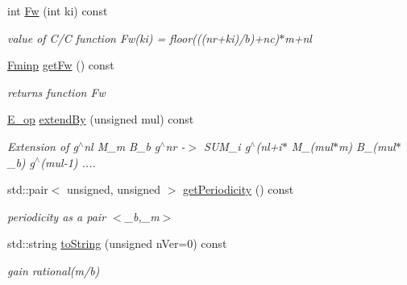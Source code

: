 \begin{DoxyCompactItemize}
int \mbox{\hyperlink{classetvo_i_i_1_1g_ng_a9047025599a1b77ecaf1ec848c5d67d3}{Fw}} (int ki) const
\begin{DoxyCompactList}\small\item\em value of C/C function Fw(ki) = floor(((nr+ki)/b)+nc)$\ast$m+nl \end{DoxyCompactList}\item 
\mbox{\label{classetvo_i_i_1_1g_ng_a86b5837b0df28b1c3dfb84aeff8a1d73}} 
\mbox{\hyperlink{classetvo_i_i_1_1_fminp}{Fminp}} \mbox{\hyperlink{classetvo_i_i_1_1g_ng_a86b5837b0df28b1c3dfb84aeff8a1d73}{get\+Fw}} () const
\begin{DoxyCompactList}\small\item\em returns function Fw \end{DoxyCompactList}\item 
\mbox{\label{classetvo_i_i_1_1g_ng_ac654c7ec491ab5a184137e01a202ef2e}} 
\mbox{\hyperlink{classetvo_i_i_1_1_e__op}{E\+\_\+op}} \mbox{\hyperlink{classetvo_i_i_1_1g_ng_ac654c7ec491ab5a184137e01a202ef2e}{extend\+By}} (unsigned mul) const
\begin{DoxyCompactList}\small\item\em Extension of g$^\wedge$nl M\+\_\+m B\+\_\+b g$^\wedge$nr -\/$>$ S\+U\+M\+\_\+i g$^\wedge$(nl+i$\ast$ M\+\_\+(mul$\ast$m) B\+\_\+(mul$\ast$\+\_\+b) g$^\wedge$(mul-\/1) .... \end{DoxyCompactList}\item 
\mbox{\label{classetvo_i_i_1_1g_ng_aaa615f59e4855b8977cc8f0ec2ed90f2}} 
std\+::pair$<$ unsigned, unsigned $>$ \mbox{\hyperlink{classetvo_i_i_1_1g_ng_aaa615f59e4855b8977cc8f0ec2ed90f2}{get\+Periodicity}} () const
\begin{DoxyCompactList}\small\item\em periodicity as a pair $<$\+\_\+b,\+\_\+m$>$ \end{DoxyCompactList}\item 
\mbox{\label{classetvo_i_i_1_1g_ng_a78675574e1c1077aa66bef9dfbc2056c}} 
std\+::string \mbox{\hyperlink{classetvo_i_i_1_1g_ng_a78675574e1c1077aa66bef9dfbc2056c}{to\+String}} (unsigned n\+Ver=0) const
\begin{DoxyCompactList}\small\item\em gain rational(m/b) \end{DoxyCompactList}\end{DoxyCompactItemize}
